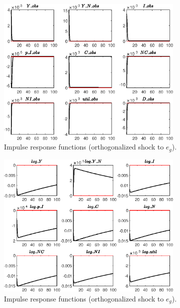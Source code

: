  
\begin{figure}[H]
\centering 
\includegraphics[width=0.80\textwidth]{BRS_growth_util/graphs/BRS_growth_util_IRF_e_g1}
\caption{Impulse response functions (orthogonalized shock to ${e_g}$).}\label{Fig:IRF:e_g:1}
\end{figure}
 
\begin{figure}[H]
\centering 
\includegraphics[width=0.80\textwidth]{BRS_growth_util/graphs/BRS_growth_util_IRF_e_g2}
\caption{Impulse response functions (orthogonalized shock to ${e_g}$).}\label{Fig:IRF:e_g:2}
\end{figure}
 

